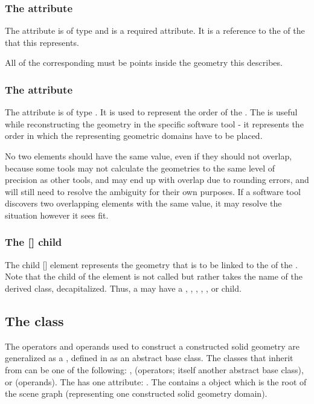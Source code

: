 \subsubsection{The \fixttspace{} attribute}
The  attribute is of type  and is a required attribute. It is a reference to the  of the \DomainType that this \CSGObject represents.

All \InteriorPoints of the corresponding \DomainType must be points inside the geometry this \CSGObject describes.


\subsubsection{The \fixttspace{} attribute}
The  attribute is of type .  It is used to represent the order of the \CSGObject. The  is useful while reconstructing the geometry in the specific software tool - it represents the order in which the \CSGObjects representing geometric domains have to be placed.

No two \CSGObject elements should have the same  value, even if they should not overlap, because some tools may not calculate the geometries to the same level of precision as other tools, and may end up with overlap due to rounding errors, and will still need to resolve the ambiguity for their own purposes.  If a software tool discovers two overlapping \CSGObject elements with the same  value, it may resolve the situation however it sees fit.


\subsubsection{The [] child}

The child [] element represents the geometry that is to be linked to the  of the \CSGObject.  Note that the child of the \CSGObject element is not called  but rather takes the name of the derived class, decapitalized.  Thus, a \CSGObject may have a , , , , , or  child.


\subsection{The  class}
\label{csgnode-class}
The operators and operands used to construct a constructed solid geometry are generalized as a \CSGNode, defined in  as an abstract base class. The classes that inherit from \CSGNode can be one of the following: \CSGSetOperator, \CSGTransformation (operators; itself another abstract base class), or \CSGPrimitive (operands). The \CSGNode has one attribute: . The \CSGObject contains a \CSGNode object which is the root of the \CSGObject scene graph (representing one constructed solid geometry domain).

